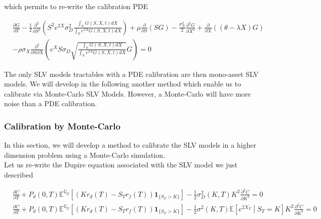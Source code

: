 \documentclass{article}
\begin{document}
\noindent which permits to re-write the calibration PDE

\begin{equation}
\begin{aligned}
\label{eq:SLVCalibrationPDE}
	&\frac{\partial G}{\partial T}
	- \frac{1}{2} \frac{\partial^2}{\partial S^2} \left(S^2 e^{2X} \sigma_D^2 \frac{\int_\mathbb{R} G(S,X,t) dX}{\int_\mathbb{R} e^{2X} G(S,X,t) dX}\right)
+ \mu \frac{\partial}{\partial S}\left( S G\right)
- \frac{\sigma_X^2}{2} \frac{\partial^2 G}{\partial X^2}
+ \frac{\partial }{\partial X} \left((\theta - \lambda X) G\right)\\
&- \rho \sigma_X \frac{\partial^2}{\partial S \partial X} \left(e^X S \sigma_D \sqrt{\frac{\int_\mathbb{R} G(S,X,t) dX}{\int_\mathbb{R} e^{2X} G(S,X,t) dX}} G\right) = 0
\end{aligned}
\end{equation}

The only SLV models tractables with a PDE calibration are then mono-asset SLV models. We will develop in the following another method which enable us to calibrate via Monte-Carlo SLV Models. However, a Monte-Carlo will have more noise than a PDE calibration.

\subsubsection{Calibration by Monte-Carlo}
In this section, we will develop a method to calibrate the SLV models in a higher dimension problem using a Monte-Carlo simulation.\\

\noindent Let us re-write the Dupire equation associated with the SLV model we just described

\begin{equation}
\begin{aligned}
	&\frac{\partial C}{\partial T} + P_d(0,T) \mathbb{E}^{\mathbb{Q}_T} \left[ \left(K r_d(T) - S_T r_f(T)\right) \textbf{1}_{\{S_T > K\}}\right] - \frac{1}{2} \sigma_D^2(K,T) K^2 \frac{\partial^2 C}{\partial K^2} = 0\\
	&\frac{\partial C}{\partial T} + P_d(0,T) \mathbb{E}^{\mathbb{Q}_T} \left[ \left(K r_d(T) - S_T r_f(T)\right) \textbf{1}_{\{S_T > K\}}\right] - \frac{1}{2} \sigma^2(K,T) \mathbb{E}\left[e^{2X_T}\middle| S_T=K\right] K^2 \frac{\partial^2 C}{\partial K^2} = 0\\
\end{aligned}
\end{equation}
\end{document}
